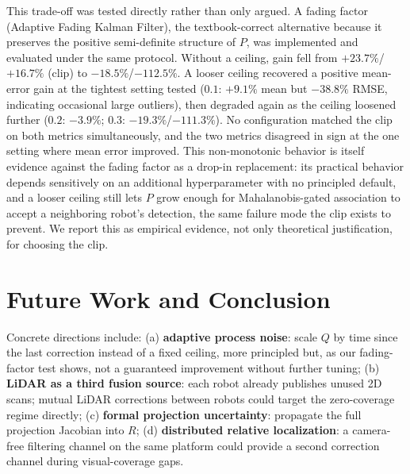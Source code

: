 \documentclass[runningheads]{llncs}
\renewcommand{\paragraph}[1]{\vspace{4pt}\noindent{\em #1}\enspace}
\begin{document}
This trade-off was tested directly rather than only argued. A
fading factor (Adaptive Fading Kalman Filter), the textbook-correct
alternative because it preserves the positive semi-definite structure
of $P$, was implemented and evaluated under the same protocol. Without
a ceiling, gain fell from $+23.7\%$/$+16.7\%$ (clip) to
$-18.5\%$/$-112.5\%$. A looser ceiling recovered a positive mean-error
gain at the tightest setting tested ($0.1$: $+9.1\%$ mean but
$-38.8\%$ RMSE, indicating occasional large outliers), then degraded
again as the ceiling loosened further ($0.2$: $-3.9\%$; $0.3$:
$-19.3\%$/$-111.3\%$). No configuration matched the clip on both
metrics simultaneously, and the two metrics disagreed in sign at the
one setting where mean error improved. This non-monotonic behavior is
itself evidence against the fading factor as a drop-in replacement:
its practical behavior depends sensitively on an additional
hyperparameter with no principled default, and a looser ceiling still
lets $P$ grow enough for Mahalanobis-gated association to accept a
neighboring robot's detection, the same failure mode the clip exists
to prevent. We report this as empirical evidence, not only theoretical
justification, for choosing the clip.

\section{Future Work and Conclusion}

\paragraph{Future work.}
\label{sec:future-work}
Concrete directions include: (a) \textbf{adaptive process noise}:
scale $Q$ by time since the last correction instead of a fixed
ceiling, more principled but, as our fading-factor test shows, not a
guaranteed improvement without further tuning; (b) \textbf{LiDAR as a
third fusion source}: each robot already publishes unused 2D scans;
mutual LiDAR corrections between robots could target the zero-coverage
regime directly; (c) \textbf{formal projection uncertainty}:
propagate the full projection Jacobian into $R$; (d) \textbf{distributed
relative localization}: a camera-free filtering channel on the same
platform could provide a second correction channel during
visual-coverage gaps.
\end{document}
